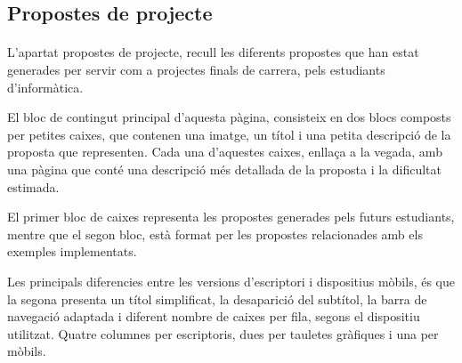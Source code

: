 \subsection{Propostes de projecte}\label{sec:proposals}

    \paragraph{}
    L'apartat propostes de projecte, recull les diferents propostes que han estat gene\-rades per servir com a projectes finals de carrera, pels estudiants d'informàtica.

    El bloc de contingut principal d'aquesta pàgina, consisteix en dos blocs composts per petites caixes, que contenen una imatge, un títol i una petita descripció de la proposta que representen. Cada una d'aquestes caixes, enllaça a la vegada, amb una pàgina que conté una descripció més detallada de la proposta i la dificultat estimada.

    El primer bloc de caixes representa les propostes generades pels futurs estudiants, mentre que el segon bloc, està format per les propostes relacionades amb els exemples implementats.

    Les principals diferencies entre les versions d'escriptori i dispositius mòbils, és que la segona presenta un títol simplificat, la desaparició del subtítol, la barra de navegació adaptada i diferent nombre de caixes per fila, segons el dispositiu utilitzat. Quatre columnes per escriptoris, dues per tauletes gràfiques i una per mòbils.
